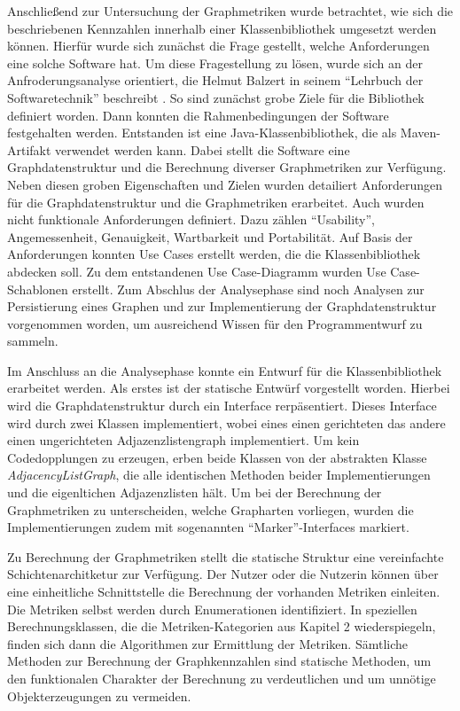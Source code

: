 \documentclass[a4paper,12pt,ngerman,chapterprefix=false,listof=totoc,bibliography=totoc]{scrreprt}
\begin{document}
{{{Anschließend zur Untersuchung der Graphmetriken wurde betrachtet, wie sich die beschriebenen Kennzahlen innerhalb einer Klassenbibliothek umgesetzt werden können. Hierfür wurde sich zunächst die Frage gestellt, welche Anforderungen eine solche Software hat. Um diese Fragestellung zu lösen, wurde sich an der Anfroderungsanalyse orientiert, die Helmut Balzert in seinem "`Lehrbuch der Softwaretechnik"' beschreibt \cite{balzert_lehrbuch_2009}. So sind zunächst grobe Ziele für die Bibliothek definiert worden. Dann konnten die Rahmenbedingungen der Software festgehalten werden. Entstanden ist eine Java-Klassenbibliothek, die als Maven-Artifakt verwendet werden kann. Dabei stellt die Software eine Graphdatenstruktur und die Berechnung diverser Graphmetriken zur Verfügung. Neben diesen groben Eigenschaften und Zielen wurden detailiert Anforderungen für die Graphdatenstruktur und die Graphmetriken erarbeitet. Auch wurden nicht funktionale Anforderungen definiert. Dazu zählen "`Usability"', Angemessenheit, Genauigkeit, Wartbarkeit und Portabilität. Auf Basis der Anforderungen konnten Use Cases erstellt werden, die die Klassenbibliothek abdecken soll. Zu dem entstandenen Use Case-Diagramm wurden Use Case-Schablonen erstellt. Zum Abschlus der Analysephase sind noch Analysen zur Persistierung eines Graphen und zur Implementierung der Graphdatenstruktur vorgenommen worden, um ausreichend Wissen für den Programmentwurf zu sammeln.

Im Anschluss an die Analysephase konnte ein Entwurf für die Klassenbibliothek erarbeitet werden. Als erstes ist der statische Entwürf vorgestellt worden. Hierbei wird die Graphdatenstruktur durch ein Interface rerpäsentiert. Dieses Interface wird durch zwei Klassen implementiert, wobei eines einen gerichteten das andere einen ungerichteten Adjazenzlistengraph implementiert. Um kein Codedopplungen zu erzeugen, erben beide Klassen von der abstrakten Klasse \textit{AdjacencyListGraph}, die alle identischen Methoden beider Implementierungen und die eigenltichen Adjazenzlisten hält. Um bei der Berechnung der Graphmetriken zu unterscheiden, welche Grapharten vorliegen, wurden die Implementierungen zudem mit sogenannten "`Marker"'-Interfaces markiert.

Zu Berechnung der Graphmetriken stellt die statische Struktur eine vereinfachte Schichtenarchitketur zur Verfügung. Der Nutzer oder die Nutzerin können über eine einheitliche Schnittstelle die Berechnung der vorhanden Metriken einleiten. Die Metriken selbst werden durch Enumerationen identifiziert. In speziellen Berechnungsklassen, die die Metriken-Kategorien aus Kapitel 2 wiederspiegeln, finden sich dann die Algorithmen zur Ermittlung der Metriken. Sämtliche Methoden zur Berechnung der Graphkennzahlen sind statische Methoden, um den funktionalen Charakter der Berechnung zu verdeutlichen und um unnötige Objekterzeugungen zu vermeiden.

}}}
\end{document}
